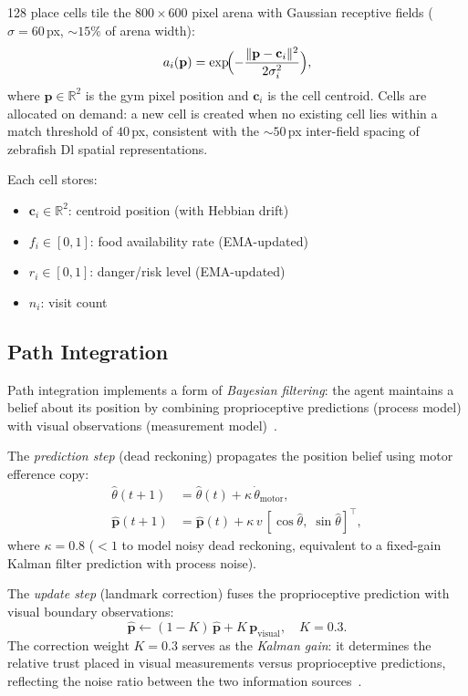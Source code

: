 \documentclass[11pt,a4paper]{article}
\begin{document}
128 place cells tile the $800\times 600$ pixel arena with Gaussian receptive
fields ($\sigma = 60$\,px, ${\sim}15\%$ of arena width):
\begin{equation}\label{eq:place_cell}
  a_i(\mathbf{p}) = \exp\!\Bigl(-\frac{\|\mathbf{p} - \mathbf{c}_i\|^2}{2\sigma_i^2}\Bigr),
\end{equation}
where $\mathbf{p} \in \mathbb{R}^2$ is the gym pixel position and
$\mathbf{c}_i$ is the cell centroid.  Cells are allocated on demand: a new
cell is created when no existing cell lies within a match threshold of
$40$\,px, consistent with the ${\sim}50$\,px inter-field spacing of zebrafish
Dl spatial representations.

Each cell stores:
\begin{itemize}[nosep]
  \item $\mathbf{c}_i \in \mathbb{R}^2$: centroid position (with Hebbian drift)
  \item $f_i \in [0,1]$: food availability rate (EMA-updated)
  \item $r_i \in [0,1]$: danger/risk level (EMA-updated)
  \item $n_i$: visit count
\end{itemize}

\subsection{Path Integration}

Path integration implements a form of \emph{Bayesian filtering}: the agent
maintains a belief about its position by combining proprioceptive
predictions (process model) with visual observations (measurement
model)~\cite{mcnaughton2006,etienne2004}.

The \emph{prediction step} (dead reckoning) propagates the position belief
using motor efference copy:
\begin{equation}\label{eq:path_integration}
\begin{aligned}
  \hat{\theta}(t{+}1) &= \hat{\theta}(t) + \kappa\,\dot{\theta}_\text{motor}, \\
  \hat{\mathbf{p}}(t{+}1) &= \hat{\mathbf{p}}(t)
    + \kappa\,v\,[\cos\hat{\theta},\;\sin\hat{\theta}]^\top,
\end{aligned}
\end{equation}
where $\kappa = 0.8$ ($<1$ to model noisy dead reckoning, equivalent to
a fixed-gain Kalman filter prediction with process noise).

The \emph{update step} (landmark correction) fuses the proprioceptive
prediction with visual boundary observations:
\begin{equation}\label{eq:pi_correction}
  \hat{\mathbf{p}} \leftarrow (1-K)\,\hat{\mathbf{p}} + K\,\mathbf{p}_\text{visual},
  \quad K = 0.3.
\end{equation}
The correction weight $K = 0.3$ serves as the \emph{Kalman gain}: it
determines the relative trust placed in visual measurements versus
proprioceptive predictions, reflecting the noise ratio between
the two information sources~\cite{mcnaughton2006}.
\end{document}
